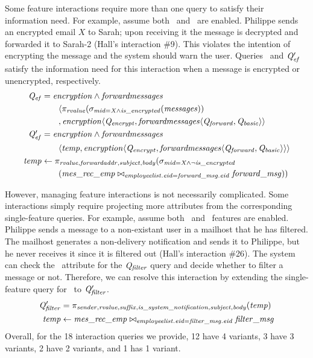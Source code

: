 \noindent
%
Some feature interactions require more than one query to satisfy their
information need.
For example, assume both \encryption\ and \forwardmessages\ are enabled.
Philippe sends an encrypted email $X$ to Sarah; upon receiving it the message
is decrypted and forwarded it to Sarah-2 (Hall's interaction \#9). This
violates the intention of encrypting the message and the system should warn the
user.
%
Queries \Qef\ and $\Qef'$ satisfy the information need for this interaction
when a message is encrypted or unencrypted, respectively.
%
\begin{align*}
\Qef &= \encryption\wedge\forwardmessages \\
  &\qquad\langle
    \projectRel{\rvalue}{(\selectRel{\midCond\wedge\isencrypted}{(\messages)})}\\
&    \qquad,
    \encryption\langle\Qencrypt, 
 \chc[\forwardmessages]{\Qforward,\Qbasic} \rangle \\
\OB{\Qef'} &= \encryption\wedge\forwardmessages\\
&\qquad  \langle \temp, \encryption \langle \Qencrypt, 
 \chc[\forwardmessages]{\Qforward,\Qbasic} \rangle \rangle \\
\temp &\leftarrow
  \pi_{\rvalue,\forwardaddr,\subject,\body} (\sigma_{\midCond \wedge \neg\isencrypted} \\
  &\qquad (\mretable \bowtie_{\employees.\eid = \forwardmsg.\eid} \forwardmsg))
\end{align*}

\noindent
%
However, managing feature interactions is not necessarily complicated. Some
interactions simply require projecting more attributes from the corresponding
single-feature queries. For example, assume both \filtermessages\ and
\mailhost\ features are enabled. Philippe sends a message to a non-existant
user in a mailhost that he has filtered. The mailhost generates a non-delivery
notification and sends it to Philippe, but he never receives it since it is filtered out
(Hall's interaction \#26). The system can check the \issystemnotification\
attribute for the $\Qfilter$ query and decide whether to filter a message or
not. Therefore, we can resolve this interaction by extending the single-feature
query for \filtermessages\ to $\Qfilter'$.
%
\begin{align*}
\small
\OB{\Qfilter'} &= 
\projectRel {\sender, \rvalue, \suffix, \issystemnotification, \subject, \body} {(\temp)}\\
\temp &\leftarrow 
{\joinRel \mretable
\filtermsg
{\employees . \eid = \filtermsg . \eid }
}
\end{align*}
\noindent
%
Overall, for the 18 interaction queries we provide, 12 have 4 variants, 3 have
3 variants, 2 have 2 variants, and 1 has 1 variant.

